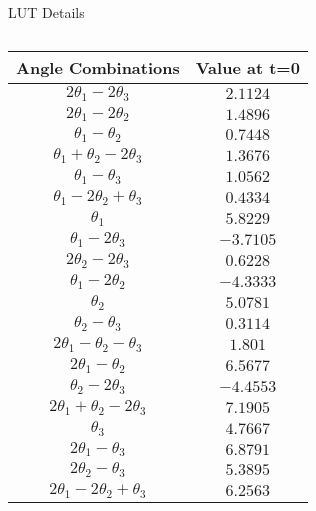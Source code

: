 \begin{table}[!htb]
    \caption{LUT Details}
    \begin{subtable}{.5\linewidth}
      \centering
        \caption{}
        \begin{tabular}{|c|c|}
            \hline
                \textbf{Angle Combinations}  & \textbf{Value at t=0}\\
                \hline
                $2\theta_{1}-2\theta_{3} $ & $ 2.1124$\\
                $2\theta_{1}-2\theta_{2} $ & $ 1.4896$\\
                $\theta_{1}-\theta_{2} $ & $ 0.7448$\\
                $\theta_{1}+\theta_{2}-2\theta_{3} $ & $ 1.3676$\\
                $\theta_{1}-\theta_{3} $ & $ 1.0562$\\
                $\theta_{1}-2\theta_{2}+\theta_{3} $ & $ 0.4334$\\
                $\theta_{1} $ & $ 5.8229$\\
                $\theta_{1}-2\theta_{3} $ & $ -3.7105$\\
                $2\theta_{2}-2\theta_{3} $ & $ 0.6228$\\
                $\theta_{1}-2\theta_{2} $ & $ -4.3333$\\
                $\theta_{2} $ & $ 5.0781$\\
                $\theta_{2}-\theta_{3} $ & $ 0.3114$\\
                $2\theta_{1}-\theta_{2}-\theta_{3} $ & $ 1.801$\\
                $2\theta_{1}-\theta_{2} $ & $ 6.5677$\\
                $\theta_{2}-2\theta_{3} $ & $ -4.4553$\\
                $2\theta_{1}+\theta_{2}-2\theta_{3} $ & $ 7.1905$\\
                $\theta_{3} $ & $ 4.7667$\\
                $2\theta_{1}-\theta_{3} $ & $ 6.8791$\\
                $2\theta_{2}-\theta_{3} $ & $ 5.3895$\\
                $2\theta_{1}-2\theta_{2}+\theta_{3} $ & $ 6.2563 $\\ 
            \hline
        \end{tabular}
    \end{subtable}%
    \begin{subtable}{.5\linewidth}
      \centering
        \caption{}

\end{subtable}
\end{table}
